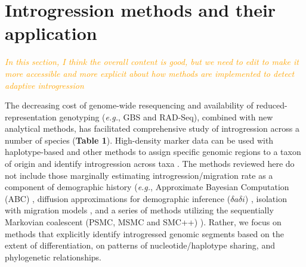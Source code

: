 \documentclass[11pt]{article}
\newcommand{\mbh}[1]{\textcolor{orange}{ \emph{\scriptsize  #1}} } %
\newcommand{\lwang}[1]{\textcolor{red}{ \emph{\scriptsize  #1}} } %
\newcommand{\gmj}[1]{\textcolor{blue}{ \emph{\scriptsize  #1}} } %
\begin{document}
\section*{Introgression methods and their application}

\mbh{In this section, I think the overall content is good, but we need to edit to make it more accessible and more explicit about how methods are implemented to detect adaptive introgression}

The decreasing cost of genome-wide resequencing and availability of reduced-representation genotyping (\emph{e.g.}, GBS and RAD-Seq), combined with new analytical methods, has facilitated comprehensive study of introgression across a number of species (\textbf{Table 1}). 
High-density marker data can be used with haplotype-based and other methods to assign specific genomic regions to a taxon of origin and identify introgression across taxa \cite{martin2015,Price2009,Lawson2012,pease2015,rosenzweig2016,geneva2015}.
The methods reviewed here do not include those marginally estimating introgression\slash migration rate as a component of demographic history (\emph{e.g.}, Approximate Bayesian Computation (ABC) \cite{beaumont2002}, diffusion approximations for demographic inference ($\delta a\delta i$) \cite{gutenkunst2009}, isolation with migration models \cite{hey2004}, and a series of methods utilizing the sequentially Markovian coalescent (PSMC, MSMC and SMC++) \cite{li2011, schiffels2014, terhorst2017}). 
Rather, we focus on methods that explicitly identify introgressed genomic segments based on the extent of differentiation, on patterns of nucleotide/haplotype sharing, and phylogenetic relationships.
\end{document}
